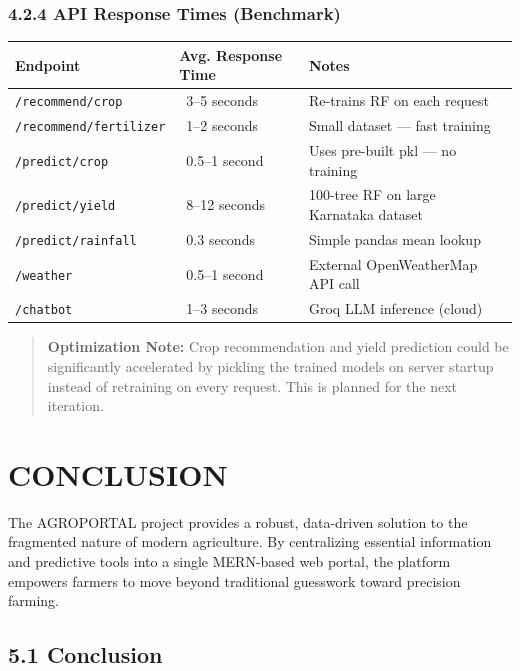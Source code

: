 \documentclass[12pt,a4paper]{report}
\begin{document}
\subsection{4.2.4 API Response Times (Benchmark)}

\begin{table}[h!]
\centering
\begin{tabular}{|l|l|l|}
\hline
Endpoint & Avg. Response Time & Notes \\ \hline
\texttt{/recommend/crop} & ~3–5 seconds & Re-trains RF on each request \\ \hline
\texttt{/recommend/fertilizer} & ~1–2 seconds & Small dataset — fast training \\ \hline
\texttt{/predict/crop} & ~0.5–1 second & Uses pre-built pkl — no training \\ \hline
\texttt{/predict/yield} & ~8–12 seconds & 100-tree RF on large Karnataka dataset \\ \hline
\texttt{/predict/rainfall} & ~0.3 seconds & Simple pandas mean lookup \\ \hline
\texttt{/weather} & ~0.5–1 second & External OpenWeatherMap API call \\ \hline
\texttt{/chatbot} & ~1–3 seconds & Groq LLM inference (cloud) \\ \hline
\end{tabular}
\end{table}

\begin{quote}
\textbf{Optimization Note:} Crop recommendation and yield prediction could be significantly accelerated by pickling the trained models on server startup instead of retraining on every request. This is planned for the next iteration.
\end{quote}

\newpage

\chapter{CONCLUSION}

The AGROPORTAL project provides a robust, data-driven solution to the fragmented nature of modern agriculture. By centralizing essential information and predictive tools into a single MERN-based web portal, the platform empowers farmers to move beyond traditional guesswork toward precision farming.

\section{5.1 Conclusion}
\end{document}
